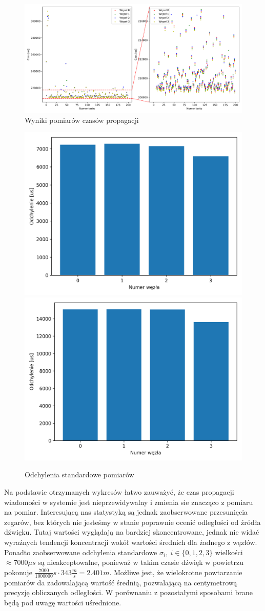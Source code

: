\begin{figure}[H]
\centering
    \includegraphics[width=\textwidth]{pics/ntp_sync/prop_times.png}
\caption{Wyniki pomiarów czasów propagacji}
\label{pic:prop_times}
\end{figure}

\begin{figure}[H]
\centering
    \includegraphics[width=.49\textwidth]{pics/ntp_sync/stddev_offsets.png}
    \includegraphics[width=.49\textwidth]{pics/ntp_sync/stddev_prop.png}
\caption{Odchylenia standardowe pomiarów}
\label{pic:stddev_ntp}
\end{figure}

Na podstawie otrzymanych wykresów łatwo zauważyć, że czas propagacji wiadomości w systemie jest nieprzewidywalny i zmienia sie znacząco z pomiaru na pomiar. Interesującą nas statystyką są jednak zaobserwowane przesunięcia zegarów, bez których nie jesteśmy w stanie poprawnie ocenić odległości od źródła dźwięku. Tutaj wartości wyglądają na bardziej skoncentrowane, jednak nie widać wyraźnych tendencji koncentracji wokół wartości średnich dla żadnego z węzłów. Ponadto zaobserwowane odchylenia standardowe $\sigma_i,\ i \in \{0,1,2,3\}$ wielkości $\approx 7000 \mu s$ są nieakceptowalne, ponieważ w takim czasie dźwięk w powietrzu pokonuje $\frac{7000}{1000000}s \cdot 343\frac{m}{s} = 2.401m$. Możliwe jest, że wielokrotne powtarzanie pomiarów da zadowalającą wartość średnią, pozwalającą na centymetrową precyzję obliczanych odległości. W porównaniu z pozostałymi sposobami brane będą pod uwagę wartości uśrednione.

